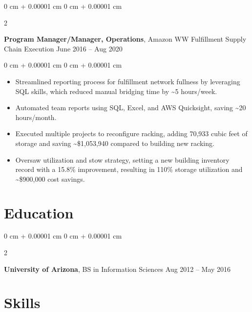 \documentclass[10pt, letterpaper]{article}
\newenvironment{highlights}{
    \begin{itemize}[
        topsep=0.10 cm,
        parsep=0.10 cm,
        partopsep=0pt,
        itemsep=0pt,
        leftmargin=0 cm + 10pt
    ]
}{
    \end{itemize}
} %
\newenvironment{onecolentry}{
    \begin{adjustwidth}{
        0 cm + 0.00001 cm
    }{
        0 cm + 0.00001 cm
    }
}{
    \end{adjustwidth}
} %
\newenvironment{twocolentry}[2][]{
    \onecolentry
    \def\secondColumn{#2}
    \setcolumnwidth{\fill, 4.5 cm}
    \begin{paracol}{2}
}{
    \switchcolumn \raggedleft \secondColumn
    \end{paracol}
    \endonecolentry
} %
\begin{document}
        \vspace{0.2 cm}

        \begin{twocolentry}{
            June 2016 – Aug 2020
        }
            \textbf{Program Manager/Manager, Operations}, Amazon WW Fulfillment Supply Chain Execution\end{twocolentry}

        \vspace{0.10 cm}
        \begin{onecolentry}
            \begin{highlights}
                \item Streamlined reporting process for fulfillment network fullness by leveraging SQL skills, which reduced manual bridging time by \textasciitilde{}5 hours/week.
                \item Automated team reports using SQL, Excel, and AWS Quicksight, saving \textasciitilde{}20 hours/month.
                \item Executed multiple projects to reconfigure racking, adding 70,933 cubic feet of storage and saving \textasciitilde{}\$1,053,940 compared to building new racking.
                \item Oversaw utilization and stow strategy, setting a new building inventory record with a 15.8\% improvement, resulting in 110\% storage utilization and \textasciitilde{}\$900,000 cost savings.
            \end{highlights}
        \end{onecolentry}



    
    \section{Education}



        
        \begin{twocolentry}{
            Aug 2012 – May 2016
        }
            \textbf{University of Arizona}, BS in Information Sciences\end{twocolentry}




    
    \section{Skills}
\end{document}

